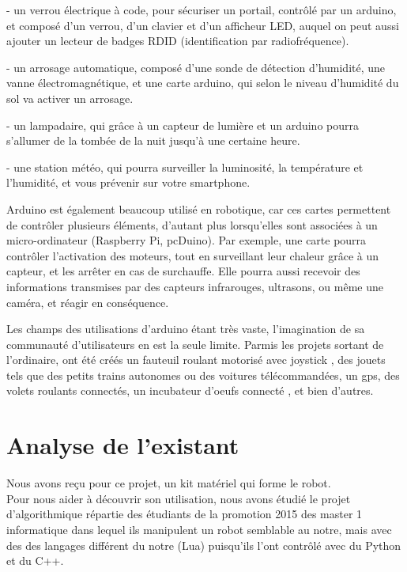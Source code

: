 \documentclass[12pt,francais]{report}
\begin{document}
- un verrou électrique à code, pour sécuriser un portail, contrôlé par un arduino, et composé d'un verrou, d'un clavier et d'un afficheur LED, auquel on peut aussi ajouter un lecteur de badges RDID (identification par radiofréquence).

- un arrosage automatique, composé d'une sonde de détection d'humidité, une vanne électromagnétique, et une carte arduino, qui selon le niveau d'humidité du sol va activer un arrosage.

- un lampadaire, qui grâce à un capteur de lumière et un arduino pourra s'allumer de la tombée de la nuit jusqu'à une certaine heure.

- une station météo, qui pourra surveiller la luminosité, la température et l'humidité, et vous prévenir sur votre smartphone.

Arduino est également beaucoup utilisé en robotique, car ces cartes permettent de contrôler plusieurs éléments, d'autant plus lorsqu'elles sont associées à un micro-ordinateur (Raspberry Pi, pcDuino). Par exemple, une carte pourra contrôler l'activation des moteurs, tout en surveillant leur chaleur grâce à un capteur, et les arrêter en cas de surchauffe. Elle pourra aussi recevoir des informations transmises par des capteurs infrarouges, ultrasons, ou même une caméra, et réagir en conséquence. \cite{ref22}

Les champs des utilisations d'arduino étant très vaste, l'imagination de sa communauté d'utilisateurs en est la seule limite. Parmis les projets sortant de l'ordinaire, ont été créés un fauteuil roulant motorisé avec joystick \cite{ref23}, des jouets tels que des petits trains autonomes ou des voitures télécommandées, un gps, des volets roulants connectés, un incubateur d'oeufs connecté \cite{ref24}, et bien d'autres.


\newpage
\section*{Analyse de l'existant}

Nous avons reçu pour ce projet, un kit matériel qui forme le robot.\\
Pour nous aider à découvrir son utilisation, nous avons étudié le projet d'algorithmique répartie des étudiants de la promotion 2015 des master 1 informatique \cite{ref1} dans lequel ils manipulent un robot semblable au notre, mais avec des des langages différent du notre (Lua) puisqu'ils l'ont contrôlé avec du Python et du C++.
\end{document}
